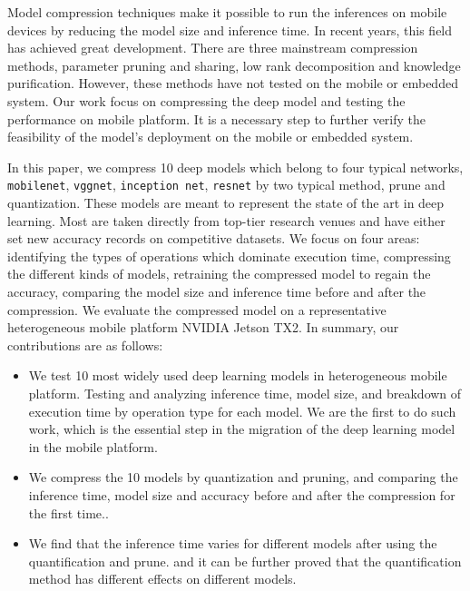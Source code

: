 Model compression techniques make it possible to run
the inferences on mobile devices by reducing the model size
and inference time.
In recent years, this field has achieved great development.
There are three mainstream compression methods,
parameter pruning and sharing\FIXME{\cite{}},
low rank decomposition\FIXME{\cite{}} and
knowledge purification\FIXME{\cite{}}.
However, these methods have not tested on the mobile or embedded system.
Our work focus on compressing the deep model and
testing the performance on mobile platform.
It is a necessary step to further verify the
feasibility of the model's deployment on the mobile
or embedded system.

In this paper, we compress 10 deep models which belong to four typical networks,
\texttt{mobilenet}, \texttt{vggnet}, \texttt{inception net}, \texttt{resnet} by two typical method, prune and quantization.
These models are meant to represent the state of
the art in deep learning. Most are
taken directly from top-tier research venues and have either
set new accuracy records on competitive datasets.
We focus on four areas: identifying the types of operations
which dominate execution time, compressing the different kinds of models,
retraining the compressed model to regain the accuracy,
comparing the model size and inference time before and after the compression.
We evaluate the compressed model on a representative heterogeneous mobile platform
NVIDIA Jetson TX2. In summary, our contributions are as follows:


\begin{itemize}
\item We test 10 most widely used deep
learning models in heterogeneous mobile platform.
Testing and analyzing inference time, model size, and
breakdown of execution time by operation type for each model.
We are the first to do such work,
which is the essential step in the migration of the
deep learning model in the mobile platform.
\item We compress the 10 models by quantization and pruning, and
comparing the inference time, model size and accuracy before and
after the compression for the first time..
\item We find that the inference
time varies for different models after using the quantification and prune.
and it can be further proved that the quantification
method has different effects on different models.
\end{itemize}


